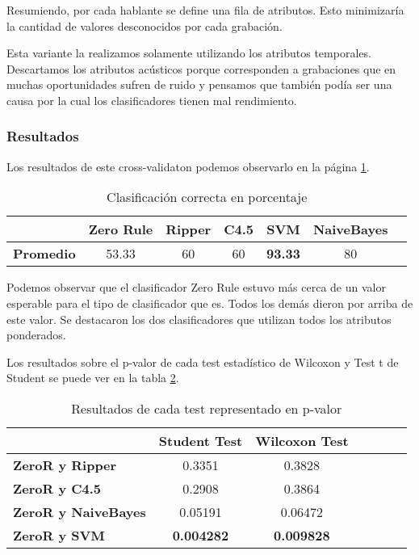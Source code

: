 Resumiendo, por cada hablante se define una fila de atributos. Esto minimizaría la cantidad de valores desconocidos por cada grabación.

Esta variante la realizamos solamente utilizando los atributos temporales. Descartamos los atributos acústicos porque corresponden a grabaciones que en muchas oportunidades sufren de ruido y pensamos que también podía ser una causa por la cual los clasificadores tienen mal rendimiento.

\subsubsection{Resultados}

Los resultados de este cross-validaton podemos observarlo en la página \ref{PAH_class_corr_en_pct}.

\begin{table}[H]
	\centering
	\begin{tabular}{|l|c|c|c|c|c|c|}
		\hline
		\textbf{}  & \textbf{Zero Rule} & \textbf{Ripper} & \textbf{C4.5} & \textbf{SVM} & \textbf{NaiveBayes} \\ \hline
		\textbf{Promedio} & 53.33 & 60 & 60 & \textbf{93.33} & 80  \\ \hline
	\end{tabular}
	\caption{Clasificación correcta en porcentaje}
	\label{PAH_class_corr_en_pct}
\end{table}

Podemos observar que el clasificador Zero Rule estuvo más cerca de un valor esperable para el tipo de clasificador que es. Todos los demás dieron por arriba de este valor. Se destacaron los dos clasificadores que utilizan todos los atributos ponderados.

Los resultados sobre el p-valor de cada test estadístico de Wilcoxon y Test t de Student se puede ver en la tabla \ref{PAH_res_tests_wilcoxon_student}.

\begin{table}[H]
	\centering
	\begin{tabular}{|l|c|c|c|c|c|c|}
		\hline
		\textbf{}  & \textbf{Student Test} & \textbf{Wilcoxon Test} \\ \hline		
			\textbf{ZeroR y Ripper}  & 0.3351 & 0.3828 \\ \hline
			\textbf{ZeroR y C4.5}  & 0.2908 &  0.3864 \\ \hline
			\textbf{ZeroR y NaiveBayes}  & 0.05191 & 0.06472 \\ \hline
			\textbf{ZeroR y SVM}  &  \textbf{0.004282} & \textbf{0.009828} \\ \hline
	\end{tabular}
	\caption{Resultados de cada test representado en p-valor}
	\label{PAH_res_tests_wilcoxon_student}
\end{table}

